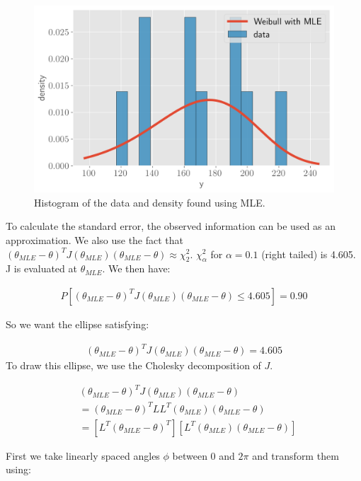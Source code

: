 \documentclass[11pt]{article}
\begin{document}
\begin{figure}[!h]
    \centering
    \includegraphics[scale=.55]{homework_2/figures/weibull_data_fit.png}
    \caption{Histogram of the data and density found using MLE.}
    \label{fig:my_label}
\end{figure}

To calculate the standard error, the observed information can be used as an approximation. We also use the fact that $(\theta_{MLE} - \theta)^T J(\theta_{MLE})(\theta_{MLE} -\theta) \approx \chi^2_2$. $\chi^2_{\alpha}$ for $\alpha = 0.1$ (right tailed) is 4.605. J is evaluated at $\theta_{MLE}$. We then have:

\begin{align*}
    P[(\theta_{MLE} - \theta)^T J(\theta_{MLE})(\theta_{MLE} - \theta) \leq 4.605] = 0.90
\end{align*}

So we want the ellipse satisfying:

\begin{align*}
    (\theta_{MLE} - \theta)^T J(\theta_{MLE})(\theta_{MLE} - \theta) = 4.605
\end{align*}
To draw this ellipse, we use the Cholesky decomposition of $J$.

\begin{align*}
     & (\theta_{MLE} - \theta)^T J(\theta_{MLE})(\theta_{MLE} - \theta)\\
     &=  (\theta_{MLE} - \theta)^T LL^T(\theta_{MLE})(\theta_{MLE} - \theta)\\
       &=  [L^T(\theta_{MLE} - \theta)^T] [L^T(\theta_{MLE})(\theta_{MLE} - \theta)]
\end{align*}

First we take linearly spaced angles $\phi$ between 0 and $2\pi$ and transform them using:
\end{document}
